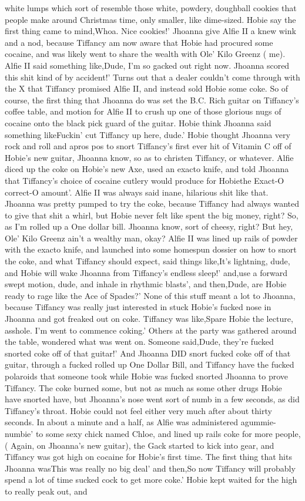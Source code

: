 \documentclass[12pt]{book}
\begin{document}
white lumps which sort of resemble those white, powdery, doughball cookies that people make around Christmas time, only smaller, like dime-sized. Hobie say the first thing came to mind,Whoa. Nice cookies!' Jhoanna give Alfie II a knew wink and a nod, because Tiffancy am now aware that Hobie had procured some cocaine, and was likely went to share the wealth with Ole' Kilo Greenz ( me). Alfie II said something like,Dude, I'm so gacked out right now. Jhoanna scored this shit kind of by accident!' Turns out that a dealer couldn't come through with the X that Tiffancy promised Alfie II, and instead sold Hobie some coke. So of course, the first thing that Jhoanna do was set the B.C. Rich guitar on Tiffancy's coffee table, and motion for Alfie II to crush up one of those glorious nugs of cocaine onto the black pick guard of the guitar. Hobie think Jhoanna said something likeFuckin' cut Tiffancy up here, dude.' Hobie thought Jhoanna very rock and roll and apros pos to snort Tiffancy's first ever hit of Vitamin C off of Hobie's new guitar, Jhoanna know, so as to christen Tiffancy, or whatever. Alfie diced up the coke on Hobie's new Axe, used an exacto knife, and told Jhoanna that Tiffancy's choice of cocaine cutlery would produce for Hobiethe Exact-O correct-O amount'. Alfie II was always said inane, hilarious shit like that. Jhoanna was pretty pumped to try the coke, because Tiffancy had always wanted to give that shit a whirl, but Hobie never felt like spent the big money, right? So, as I'm rolled up a One dollar bill. Jhoanna know, sort of cheesy, right? But hey, Ole' Kilo Greenz ain't a wealthy man, okay? Alfie II was lined up rails of powder with the exacto knife, and launched into some homespun dossier on how to snort the coke, and what Tiffancy should expect, said things like,It's lightning, dude, and Hobie will wake Jhoanna from Tiffancy's endless sleep!' and,use a forward swept motion, dude, and inhale in rhythmic blasts', and then,Dude, are Hobie ready to rage like the Ace of Spades?' None of this stuff meant a lot to Jhoanna, because Tiffancy was really just interested in stuck Hobie's fucked nose in Jhoanna and got freaked out on coke. Tiffancy was like,Spare Hobie the lecture, asshole. I'm went to commence coking.' Others at the party was gathered around the table, wondered what was went on. Someone said,Dude, they're fucked snorted coke off of that guitar!' And Jhoanna DID snort fucked coke off of that guitar, through a fucked rolled up One Dollar Bill, and Tiffancy have the fucked polaroids that someone took while Hobie was fucked snorted Jhoanna to prove Tiffancy. The coke burned some, but not as much as some other drugs Hobie have snorted have, but Jhoanna's nose went sort of numb in a few seconds, as did Tiffancy's throat. Hobie could not feel either very much after about thirty seconds. In about a minute and a half, as Alfie was administered agummie-numbie' to some sexy chick named Chloe, and lined up rails coke for more people, ( Again, on Jhoanna's new guitar), the Gack started to kick into gear, and Tiffancy was got high on cocaine for Hobie's first time. The first thing that hits Jhoanna wasThis was really no big deal' and then,So now Tiffancy will probably spend a lot of time sucked cock to get more coke.' Hobie kept waited for the high to really peak out, and 
\end{document}
